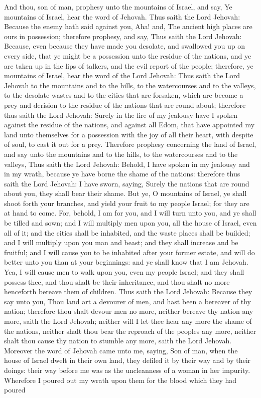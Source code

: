 And thou, son of man, prophesy unto the mountains of Israel, and say, Ye mountains of Israel, hear the word of Jehovah. Thus saith the Lord Jehovah: Because the enemy hath said against you, Aha! and, The ancient high places are ours in possession; therefore prophesy, and say, Thus saith the Lord Jehovah: Because, even because they have made you desolate, and swallowed you up on every side, that ye might be a possession unto the residue of the nations, and ye are taken up in the lips of talkers, and the evil report of the people; therefore, ye mountains of Israel, hear the word of the Lord Jehovah: Thus saith the Lord Jehovah to the mountains and to the hills, to the watercourses and to the valleys, to the desolate wastes and to the cities that are forsaken, which are become a prey and derision to the residue of the nations that are round about; therefore thus saith the Lord Jehovah: Surely in the fire of my jealousy have I spoken against the residue of the nations, and against all Edom, that have appointed my land unto themselves for a possession with the joy of all their heart, with despite of soul, to cast it out for a prey. Therefore prophesy concerning the land of Israel, and say unto the mountains and to the hills, to the watercourses and to the valleys, Thus saith the Lord Jehovah: Behold, I have spoken in my jealousy and in my wrath, because ye have borne the shame of the nations: therefore thus saith the Lord Jehovah: I have sworn, saying, Surely the nations that are round about you, they shall bear their shame.  But ye, O mountains of Israel, ye shall shoot forth your branches, and yield your fruit to my people Israel; for they are at hand to come. For, behold, I am for you, and I will turn unto you, and ye shall be tilled and sown; and I will multiply men upon you, all the house of Israel, even all of it; and the cities shall be inhabited, and the waste places shall be builded; and I will multiply upon you man and beast; and they shall increase and be fruitful; and I will cause you to be inhabited after your former estate, and will do better unto you than at your beginnings: and ye shall know that I am Jehovah. Yea, I will cause men to walk upon you, even my people Israel; and they shall possess thee, and thou shalt be their inheritance, and thou shalt no more henceforth bereave them of children. Thus saith the Lord Jehovah: Because they say unto you, Thou land art a devourer of men, and hast been a bereaver of thy nation; therefore thou shalt devour men no more, neither bereave thy nation any more, saith the Lord Jehovah; neither will I let thee hear any more the shame of the nations, neither shalt thou bear the reproach of the peoples any more, neither shalt thou cause thy nation to stumble any more, saith the Lord Jehovah.  Moreover the word of Jehovah came unto me, saying, Son of man, when the house of Israel dwelt in their own land, they defiled it by their way and by their doings: their way before me was as the uncleanness of a woman in her impurity. Wherefore I poured out my wrath upon them for the blood which they had poured 